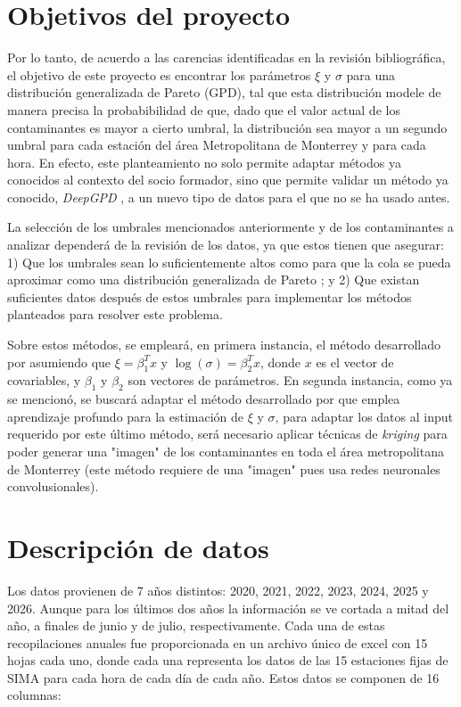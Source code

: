 \documentclass[11pt]{article}
\begin{document}
\section{Objetivos del proyecto}

Por lo tanto, de acuerdo a las carencias identificadas en la revisión bibliográfica, el objetivo de este proyecto es encontrar los parámetros $\xi$ y $\sigma$ para una distribución generalizada de Pareto (GPD), tal que esta distribución modele de manera precisa la probabibilidad de que, dado que el valor actual de los contaminantes es mayor a cierto umbral, la distribución sea mayor a un segundo umbral para cada estación del área Metropolitana de Monterrey y para cada hora. En efecto, este planteamiento no solo permite adaptar métodos ya conocidos al contexto del socio formador, sino que permite validar un método ya conocido, \textit{DeepGPD} \citep{wilson2022deepgpd}, a un nuevo tipo de datos para el que no se ha usado antes.

La selección de los umbrales mencionados anteriormente y de los contaminantes a analizar dependerá de la revisión de los datos, ya que estos tienen que asegurar: 1) Que los umbrales sean lo suficientemente altos como para que la cola se pueda aproximar como una distribución generalizada de Pareto \citep{Coles2001, wilson2022deepgpd}; y 2) Que existan suficientes datos después de estos umbrales para implementar los métodos planteados para resolver este problema.

Sobre estos métodos, se empleará, en primera instancia, el método desarrollado por \cite{Coles2001} asumiendo que $\xi = \beta_1^T x$ y $\log(\sigma) = \beta_2^T x$, donde $x$ es el vector de covariables, y $\beta_1$ y $\beta_2$ son vectores de parámetros. En segunda instancia, como ya se mencionó, se buscará adaptar el método desarrollado por \cite{wilson2022deepgpd} que emplea aprendizaje profundo para la estimación de $\xi$ y $\sigma$, para adaptar los datos al input requerido por este último método, será necesario aplicar técnicas de \textit{kriging} para poder generar una "imagen" de los contaminantes en toda el área metropolitana de Monterrey (este método requiere de una "imagen" pues usa redes neuronales convolusionales).

\section{Descripción de datos}

Los datos provienen de 7 años distintos: 2020, 2021, 2022, 2023, 2024, 2025 y 2026. Aunque para los últimos dos años la información se ve cortada a mitad del año, a finales de junio y de julio, respectivamente. Cada una de estas recopilaciones anuales fue proporcionada en un archivo único de excel con 15 hojas cada uno, donde cada una representa los datos de las 15 estaciones fijas de SIMA para cada hora de cada día de cada año. Estos datos se componen de 16 columnas:
\end{document}

